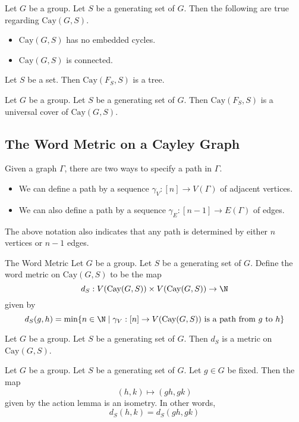 \documentclass[a4paper]{article}
\begin{document}
\begin{prp}{}{} Let $G$ be a group. Let $S$ be a generating set of $G$. Then the following are true regarding $\text{Cay}(G,S)$. 
\begin{itemize}
\item $\text{Cay}(G,S)$ has no embedded cycles. 
\item $\text{Cay}(G,S)$ is connected. 
\end{itemize}
\end{prp}

\begin{prp}{}{} Let $S$ be a set. Then $\text{Cay}(F_S,S)$ is a tree. 
\end{prp}

\begin{prp}{}{} Let $G$ be a group. Let $S$ be a generating set of $G$. Then $\text{Cay}(F_S,S)$ is a universal cover of $\text{Cay}(G,S)$. 
\end{prp}

\subsection{The Word Metric on a Cayley Graph}
Given a graph $\Gamma$, there are two ways to specify a path in $\Gamma$. 
\begin{itemize}
\item We can define a path by a sequence $\gamma_V:[n]\to V(\Gamma)$ of adjacent vertices. 
\item We can also define a path by a sequence $\gamma_E:[n-1]\to E(\Gamma)$ of edges. 
\end{itemize}

The above notation also indicates that any path is determined by either $n$ vertices or $n-1$ edges. 

\begin{defn}{The Word Metric}{} Let $G$ be a group. Let $S$ be a generating set of $G$. Define the word metric on $\text{Cay}(G,S)$ to be the map $$d_S:V(\text{Cay}(G,S))\times V(\text{Cay}(G,S))\to\N$$ given by $$d_S(g,h)=\min\{n\in\N\;|\;\gamma_V:[n]\to V(\text{Cay}(G,S))\text{ is a path from }g\text{ to }h\}$$
\end{defn}

\begin{lmm}{}{} Let $G$ be a group. Let $S$ be a generating set of $G$. Then $d_S$ is a metric on $\text{Cay}(G,S)$. 
\end{lmm}

\begin{prp}{}{} Let $G$ be a group. Let $S$ be a generating set of $G$. Let $g\in G$ be fixed. Then the map $$(h,k)\mapsto(gh,gk)$$ given by the action lemma is an isometry. In other words, $$d_S(h,k)=d_S(gh,gk)$$
\end{prp}
\end{document}
